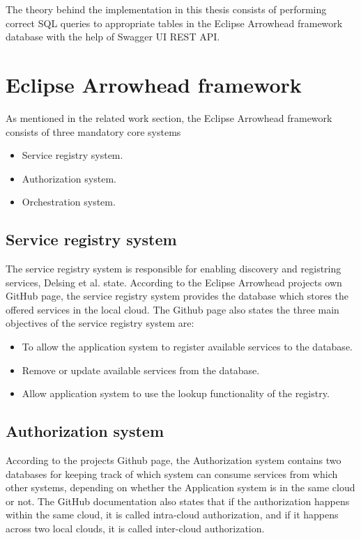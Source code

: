 The theory behind the implementation in this thesis consists of performing correct SQL queries to appropriate tables in the Eclipse Arrowhead framework database with the help of Swagger UI REST API.
\section{Eclipse Arrowhead framework} 

As mentioned in the related work section, the Eclipse Arrowhead framework consists of three mandatory core systems
\begin{itemize}
    \item Service registry system.
    \item Authorization system. 
    \item Orchestration system.
\end{itemize} 
\subsection{Service registry system}
The service registry system is responsible for enabling discovery and registring services, Delsing et al. state. 
According to the Eclipse Arrowhead projects own GitHub page, the service registry system provides the database which stores the offered services in the local cloud.\cite{Github2021}
The Github page also states the three main objectives of the service registry system are:
\begin{itemize}
    \item To allow the application system to register available services to the database. 
    \item Remove or update available services from the database.
    \item Allow application system to use the lookup functionality of the registry.
\end{itemize}
\subsection{Authorization system}
According to the projects Github page, the Authorization system contains two databases for keeping track of which system can consume services from which other systems, depending on whether the Application system is in the same cloud or not.
The GitHub documentation also states that if the authorization happens within the same cloud, it is called intra-cloud authorization, and if it happens across two local clouds, it is called inter-cloud authorization.\cite{Github2021}
